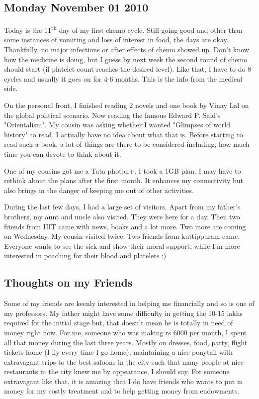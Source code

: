 \vskip 2pt

\subsection*{Monday November 01 2010}

Today is the 11\textsuperscript{th} day of my first chemo cycle. Still going good and other
than some instances of vomiting and loss of interest in food, the days are okay.
Thankfully, no major infections or after effects of chemo showed up. 
Don't know how the medicine is doing, but I guess by next week the second 
round of chemo should start (if platelet count reaches the desired level). 
Like that, I have to do 8 cycles and usually it goes on for 4-6 months. 
This is the info from the medical side.

On the personal front, I finished reading 2 novels and one book by Vinay 
Lal on the global political scenario. Now reading the famous Edward P. Said's 
"Orientalism". My cousin was asking whether I wanted "Glimpses of world history" 
to read. I actually have no idea about what that is. Before starting to read such a book, 
a lot of things are there to be considered including, how much time you can devote to 
think about it. 

One of my cousins got me a Tata photon+. I took a 1GB plan. I may have to rethink 
about the plans after the first month. It enhances my connectivity but also brings 
in the danger of keeping me out of other activities.

During the last few days, I had a large set of visitors. Apart from my father's brothers,
my aunt and uncle also visited. They were here for a day. Then two friends from IIIT 
came with news, books and a lot more. Two more are coming on Wednesday. My cousin visited 
twice. Two friends from kuttippuram came. Everyone wants to see the sick and 
show their moral support, while I'm more interested in poaching for their blood and 
platelets :) 

\subsection*{Thoughts on my Friends}

Some of my friends are keenly interested in helping me financially and so is one of my professors. 
My father might have some difficulty in getting the 10-15 lakhs required for the initial stage 
but, that doesn't mean he is totally in need of money right now. For me, someone who was making 
rs 6000 per month, I spent all that money during the last three years. Mostly on dresses, food, party, 
flight tickets home (I fly every time I go home), maintaining a nice ponytail with extravagant trips to the best 
saloons in the city such that many people at nice restaurants in the city knew me by appearance, I should say. 
For someone extravagant like that, it is amazing that I do have friends who wants to put in money 
for my costly treatment and to help getting money from endowments. 

